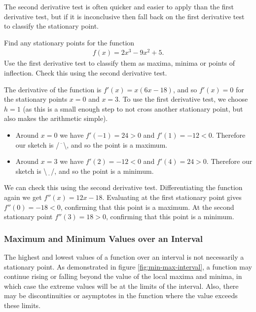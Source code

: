 The second derivative test is often quicker and easier to apply than the first derivative test, but if it is inconclusive then fall back on the first derivative test to classify the stationary point.

\begin{example}
    Find any stationary points for the function
    \begin{align*}
        f(x) = 2x^3 - 9x^2 + 5.
    \end{align*}
    Use the first derivative test to classify them as maxima, minima or points of inflection. Check this using the second derivative test.
\end{example}
The derivative of the function is $f'(x) = x(6x - 18)$, and so $f'(x) = 0$ for the stationary points $x=0$ and $x=3$. To use the first derivative test, we choose $h=1$ (as this is a small enough step to not cross another stationary point, but also makes the arithmetic simple).
\begin{itemize}
    \item Around $x = 0$ we have $f'(-1) = 24 > 0$ and $f'(1)=-12<0$. Therefore our sketch is /$\overline{\phantom{x}}$\textbackslash, and so the point is a maximum.
    \item Around $x = 3$ we have $f'(2) = -12 < 0$ and $f'(4)=24>0$. Therefore our sketch is \textbackslash$\underline{\phantom{x}}$/, and so the point is a minimum.
\end{itemize}
We can check this using the second derivative test. Differentiating the function again we get $f''(x) = 12x - 18$. Evaluating at the first stationary point gives $f''(0) = -18 < 0$, confirming that this point is a maximum. At the second stationary point $f''(3) = 18 > 0$, confirming that this point is a minimum.

\subsubsection{Maximum and Minimum Values over an Interval}

The highest and lowest values of a function over an interval is not necessarily a stationary point. As demonstrated in figure \ref{fig:min-max-interval}, a function may continue rising or falling beyond the value of the local maxima and minima, in which case the extreme values will be at the limits of the interval. Also, there may be discontinuities or asymptotes in the function where the value exceeds these limits. 

